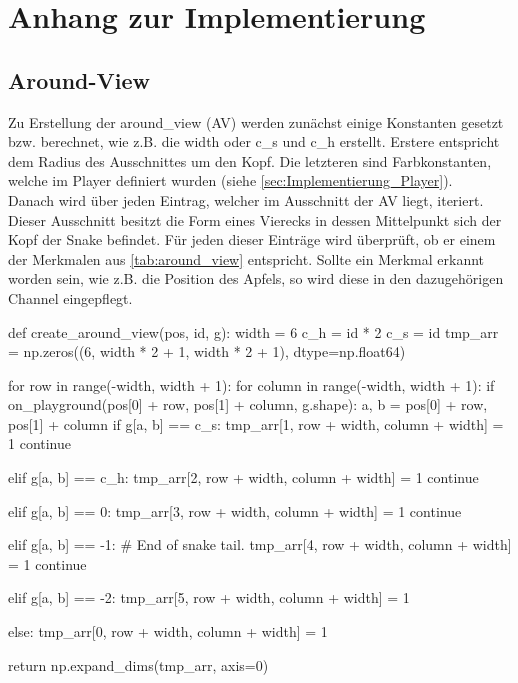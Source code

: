 \chapter{Anhang zur Implementierung}

\section{Around-View} \label{sec:Anhang-Implementierung-Around-View}
Zu Erstellung der around\_view (AV) werden zunächst einige Konstanten gesetzt bzw. berechnet, wie z.B. die width oder c\_s und c\_h erstellt. Erstere entspricht dem Radius des Ausschnittes um den Kopf. Die letzteren sind Farbkonstanten, welche im Player definiert wurden (siehe \ref{sec:Implementierung_Player}).\\
Danach wird über jeden Eintrag, welcher im Ausschnitt der AV liegt, iteriert. Dieser Ausschnitt besitzt die Form eines Vierecks in dessen Mittelpunkt sich der Kopf der Snake befindet. Für jeden dieser Einträge wird überprüft, ob er einem der Merkmalen aus \ref{tab:around_view} entspricht. Sollte ein Merkmal erkannt worden sein, wie z.B. die Position des Apfels, so wird diese in den dazugehörigen Channel eingepflegt.
\begin{python}
	def create_around_view(pos, id, g):
		width = 6
		c_h = id * 2
		c_s = id
		tmp_arr = np.zeros((6, width * 2 + 1, width * 2 + 1), dtype=np.float64)
	
		for row in range(-width, width + 1):
			for column in range(-width, width + 1):
				if on_playground(pos[0] + row, pos[1] + column, g.shape):
					a, b = pos[0] + row, pos[1] + column
					if g[a, b] == c_s:
						tmp_arr[1, row + width, column + width] = 1
						continue
	
					elif g[a, b] == c_h:
						tmp_arr[2, row + width, column + width] = 1
						continue
	
					elif g[a, b] == 0:
						tmp_arr[3, row + width, column + width] = 1
						continue
	
					elif g[a, b] == -1:  # End of snake tail.
						tmp_arr[4, row + width, column + width] = 1
						continue
	
					elif g[a, b] == -2:
						tmp_arr[5, row + width, column + width] = 1
	
				else:
				tmp_arr[0, row + width, column + width] = 1
	
		return np.expand_dims(tmp_arr, axis=0)
\end{python}


